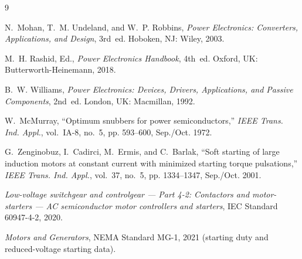 \documentclass[11pt,a4paper]{article}
\begin{document}
\begin{thebibliography}{9}

N.~Mohan, T.~M. Undeland, and W.~P. Robbins,
\emph{Power Electronics: Converters, Applications, and Design}, 3rd~ed.
Hoboken, NJ: Wiley, 2003.

M.~H. Rashid, Ed., \emph{Power Electronics Handbook}, 4th~ed.
Oxford, UK: Butterworth-Heinemann, 2018.

B.~W. Williams, \emph{Power Electronics: Devices, Drivers, Applications, and
Passive Components}, 2nd~ed. London, UK: Macmillan, 1992.

W.~McMurray, ``Optimum snubbers for power semiconductors,''
\emph{IEEE Trans. Ind. Appl.}, vol.~IA-8, no.~5, pp. 593--600,
Sep./Oct. 1972.

G.~Zenginobuz, I.~Cadirci, M.~Ermis, and C.~Barlak,
``Soft starting of large induction motors at constant current with minimized
starting torque pulsations,''
\emph{IEEE Trans. Ind. Appl.}, vol.~37, no.~5, pp. 1334--1347,
Sep./Oct. 2001.

\emph{Low-voltage switchgear and controlgear --- Part 4-2: Contactors and
motor-starters --- AC semiconductor motor controllers and starters},
IEC Standard 60947-4-2, 2020.

\emph{Motors and Generators}, NEMA Standard MG-1, 2021 (starting duty and
reduced-voltage starting data).

\end{thebibliography}
\end{document}
